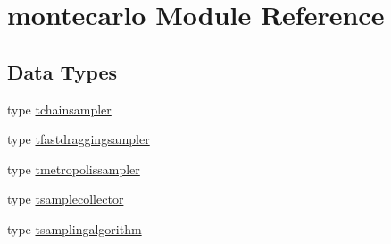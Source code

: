 \hypertarget{namespacemontecarlo}{}\section{montecarlo Module Reference}
\label{namespacemontecarlo}
\subsection*{Data Types}
\begin{DoxyCompactItemize}
\item 
type \mbox{\hyperlink{structmontecarlo_1_1tchainsampler}{tchainsampler}}
\item 
type \mbox{\hyperlink{structmontecarlo_1_1tfastdraggingsampler}{tfastdraggingsampler}}
\item 
type \mbox{\hyperlink{structmontecarlo_1_1tmetropolissampler}{tmetropolissampler}}
\item 
type \mbox{\hyperlink{structmontecarlo_1_1tsamplecollector}{tsamplecollector}}
\item 
type \mbox{\hyperlink{structmontecarlo_1_1tsamplingalgorithm}{tsamplingalgorithm}}
\end{DoxyCompactItemize}
